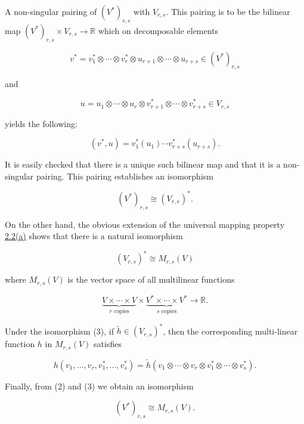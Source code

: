 \begin{definition}\label{thm:2.8}
A non-singular pairing of $(V^{*})_{r,s}$ with $V_{r,s}$. This pairing is to be the bilinear map $(V^{*})_{r,s} \times V_{r,s} \to \mathbb{R}$ which on decomposable elements

\[
v^{*}=v_{1}^{*}\otimes\cdots\otimes v_{r}^{*}\otimes u_{r+1}\otimes\cdots\otimes u_{r+s}\in(V^{*})_{r,s}
\]

and

\[
u=u_{1}\otimes\cdots\otimes u_{r}\otimes v_{r+1}^{*}\otimes\cdots\otimes v_{r+s}^{*}\in V_{r,s}
\]

yields the following:

\begin{equation}
\tag{1}\label{eq:2.8:1}
(v^{*},u)=v_{1}^{*}(u_{1})\cdots v_{r+s}^{*}(u_{r+s}).
\end{equation}

It is easily checked that there is a unique such bilinear map and that it is a non-singular pairing. This pairing establishes an isomorphism

\begin{equation}
\tag{2}\label{eq:2.8:2}
(V^{*})_{r,s}\cong(V_{r,s})^{*}.
\end{equation}

On the other hand, the obvious extension of the universal mapping property \hyperref[thm:2.2]{2.2(a)} shows that there is a natural isomorphism

\begin{equation}
\tag{3}\label{eq:2.8:3}
(V_{r,s})^{*}\cong M_{r,s}(V)
\end{equation}

where $M_{r,s}(V)$ is the vector space of all multilinear functions

\[
\underbrace{V\times\cdots\times V}_{r\text{ copies}}\times\underbrace{V^{*}\times\cdots\times V^{*}}_{s\text{ copies}}\to\mathbb{R}.
\]

Under the isomorphism (3), if $\tilde{h} \in (V_{r,s})^{*}$, then the corresponding multi-linear function $h$ in $M_{r,s}(V)$ satisfies

\begin{equation}
\tag{4}\label{eq:2.8:4}
h(v_{1},\ldots,v_{r},v_{1}^{*},\ldots,v_{s}^{*})=\tilde{h}(v_{1}\otimes\cdots\otimes v_{r}\otimes v_{1}^{*}\otimes\cdots\otimes v_{s}^{*}).
\end{equation}

Finally, from (2) and (3) we obtain an isomorphism

\begin{equation}
\tag{5}\label{eq:2.8:5}
(V^{*})_{r,s}\cong M_{r,s}(V).
\end{equation}

\end{definition}

